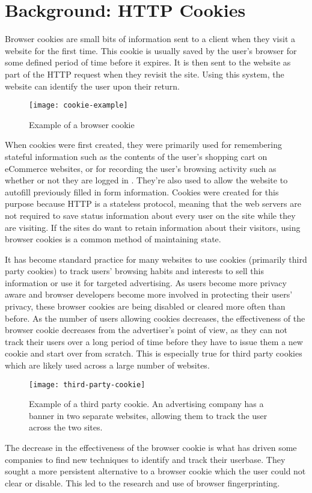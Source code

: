 \chapter{Background: HTTP Cookies}

Browser cookies are small bits of information sent to a client when they visit a website for the first time.
This cookie is usually saved by the user's browser for some defined period of time before it expires.
It is then sent to the website as part of the HTTP request when they revisit the site.
Using this system, the website can identify the user upon their return.

\begin{figure}[h]
\texttt{[image: cookie-example]}
\centering
\caption{Example of a browser cookie}
\end{figure}

When cookies were first created, they were primarily used for remembering stateful information such as the contents of the user's shopping cart on eCommerce websites, or for recording the user's browsing activity such as whether or not they are logged in \citep{cookiesbackground}.
They're also used to allow the website to autofill previously filled in form information.
Cookies were created for this purpose because HTTP is a stateless protocol, meaning that the web servers are not required to save status information about every user on the site while they are visiting.
If the sites do want to retain information about their visitors, using browser cookies is a common method of maintaining state.

It has become standard practice for many websites to use cookies (primarily third party cookies) to track users' browsing habits and interests to sell this information or use it for targeted advertising.
As users become more privacy aware and browser developers become more involved in protecting their users' privacy, these browser cookies are being disabled or cleared more often than before.
As the number of users allowing cookies decreases, the effectiveness of the browser cookie decreases from the advertiser's point of view, as they can not track their users over a long period of time before they have to issue them a new cookie and start over from scratch.
This is especially true for third party cookies which are likely used across a large number of websites.

\begin{figure}[h]
\texttt{[image: third-party-cookie]}
\centering
\caption{Example of a third party cookie.
An advertising company has a banner in two separate websites, allowing them to track the user across the two sites.}
\end{figure}

The decrease in the effectiveness of the browser cookie is what has driven some companies to find new techniques to identify and track their userbase.
They sought a more persistent alternative to a browser cookie which the user could not clear or disable.
This led to the research and use of browser fingerprinting.

